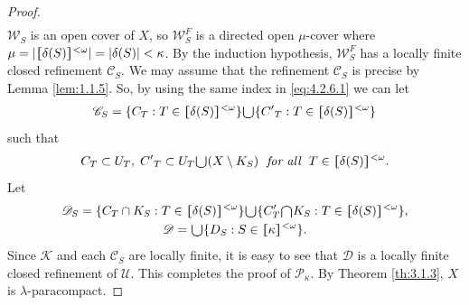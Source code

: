 \documentclass[ch4.tex]{subfiles}
\begin{document}
\begin{proof}
\begin{gather}
\end{gather}
\noindent $\mathscr{W}_S$ is an
open cover of $X$, so $\mathscr{W}_S^{F}$ is a directed open
$\mu$-cover where $\mu = |\hstretch{1.8}{[}\delta(S)\hstretch{1.8}{]}^{<\omega}| = |\delta(S)| < \kappa$. 
By the induction hypothesis, $\mathscr{W}_S^{F}$ has a locally finite closed refinement $\mathscr{C}_S$. 
We may assume that the refinement $\mathscr{C}_S$ is precise by Lemma \ref{lem:1.1.5}. 
So, by using the same index in \eqref{eq:4.2.6.1} 
we can let
\begin{gather}
\mathscr{C}_S = \{C_T: T\in \hstretch{1.8}{[}\delta(S)\hstretch{1.8}{]}^{<\omega} \}
\raisebox{-2pt}{\scalebox{1.5}{$\cup$}} \{{C'}_T: T\in \hstretch{1.8}{[}\delta(S)\hstretch{1.8}{]}^{<\omega}\} \label{eq:4.2.6.2}
\end{gather}
such that
\begin{gather}
	C_T \subset U_T, \; {C'}_T \subset U_T\raisebox{-2pt}{\scalebox{1.5}{$\cup$}}
	 (X \setminus K_S) \; \textit{ for all } \; T\in \hstretch{1.8}{[}\delta(S)\hstretch{1.8}{]}^{<\omega}. \label{eq:4.2.6.3}
\end{gather}
Let
\begin{gather}
\mathscr{D} _S=\{C_T\cap K_S: T\in \hstretch{1.8}{[}\delta(S)\hstretch{1.8}{]}^{<\omega}\} 
\raisebox{-2pt}{\scalebox{1.5}{$\cup$}}
  \{C'_T\raisebox{-2pt}{\scalebox{1.5}{$\cap$}} K_S: T\in \hstretch{1.8}{[}\delta(S)\hstretch{1.8}{]}^{<\omega}\}, \\
\mathscr{D} = \raisebox{-2pt}{\scalebox{1.5}{$\cup$}} \{D_S: S \in \hstretch{1.8}{[}\kappa\hstretch{1.8}{]}^{<\omega}\}. 
\end{gather}
\noindent Since $\mathscr{K}$ and each 
$\mathscr{C}_S$ are locally finite, it is easy to see that $\mathscr{D}$ is
a locally finite closed refinement of $\mathscr{U}$. This completes the proof of
$\mathcal{P}_\kappa$. By Theorem \ref{th:3.1.3},  $X$ is $\lambda$-paracompact.
\end{proof}
\end{document}

